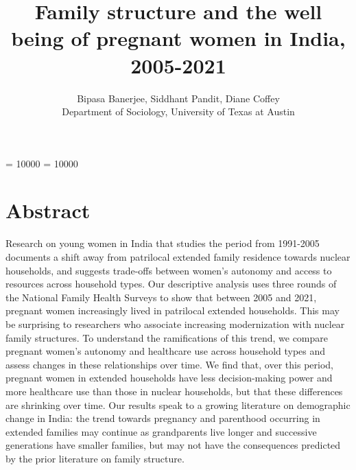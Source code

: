 \documentclass[10pt,twoside,reqno]{article}
\title{Family structure and the well being of pregnant women in India, 2005-2021}
\author{Bipasa Banerjee, Siddhant Pandit, Diane Coffey \\
\small Department of Sociology, University of Texas at Austin}
\date{}
\begin{document}
\onehalfspacing
\widowpenalty = 10000
\clubpenalty = 10000

\setlength{\parskip}{0ex}
\setlength{\parindent}{.7cm}
\setlength{\bibsep}{.18cm}
\setlength{\belowdisplayskip}{15pt} \setlength{\belowdisplayshortskip}{10pt}
\setlength{\abovedisplayskip}{15pt} \setlength{\abovedisplayshortskip}{10pt}


\maketitle
\thispagestyle{plain}


					
\maketitle
\thispagestyle{plain}



\section*{Abstract}
Research on young women in India that studies the period from 1991-2005 documents a shift away from patrilocal extended family residence towards nuclear households, and suggests trade-offs between women’s autonomy and access to resources across household types.  Our descriptive analysis uses three rounds of the National Family Health Surveys to show that between 2005 and 2021, pregnant women increasingly lived in patrilocal extended households.  This may be surprising to researchers who associate increasing modernization with nuclear family structures.  To understand the ramifications of this trend, we compare pregnant women’s autonomy and healthcare use across household types and assess changes in these relationships over time.  We find that, over this period, pregnant women in extended households have less decision-making power and more healthcare use than those in nuclear households, but that these differences are shrinking over time. Our results speak to a growing literature on demographic change in India: the trend towards pregnancy and parenthood occurring in extended families may continue as grandparents live longer and successive generations have smaller families, but may not have the consequences predicted by the prior literature on family structure.
 
\end{document}
